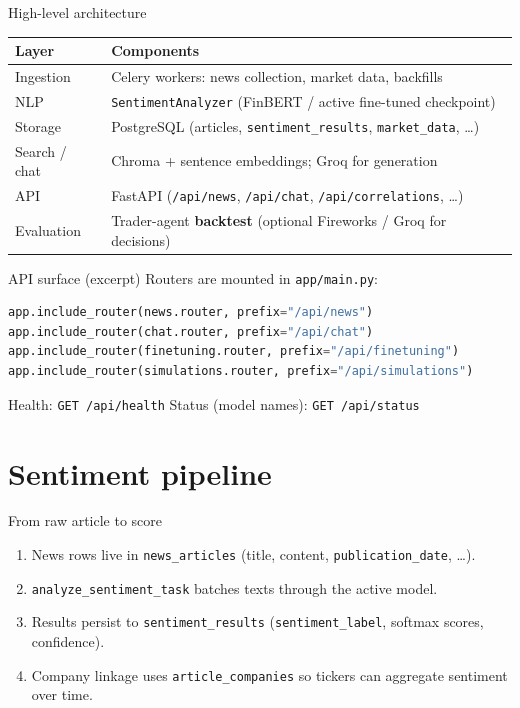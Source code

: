 \documentclass[aspectratio=169,11pt]{beamer}
\begin{document}
\begin{frame}{High-level architecture}
  \begin{center}
    \small
    \begin{tabular}{@{}l l@{}}
      \toprule
      \textbf{Layer} & \textbf{Components} \\
      \midrule
      Ingestion & Celery workers: news collection, market data, backfills \\
      NLP & \texttt{SentimentAnalyzer} (FinBERT / active fine-tuned checkpoint) \\
      Storage & PostgreSQL (articles, \texttt{sentiment\_results}, \texttt{market\_data}, \ldots) \\
      Search / chat & Chroma + sentence embeddings; Groq for generation \\
      API & FastAPI (\texttt{/api/news}, \texttt{/api/chat}, \texttt{/api/correlations}, \ldots) \\
      Evaluation & Trader-agent \textbf{backtest} (optional Fireworks / Groq for decisions) \\
      \bottomrule
    \end{tabular}
  \end{center}
\end{frame}

\begin{frame}[fragile]{API surface (excerpt)}
  Routers are mounted in \texttt{app/main.py}:
\begin{lstlisting}[language=Python]
app.include_router(news.router, prefix="/api/news")
app.include_router(chat.router, prefix="/api/chat")
app.include_router(finetuning.router, prefix="/api/finetuning")
app.include_router(simulations.router, prefix="/api/simulations")
\end{lstlisting}
  \vfill
  \footnotesize Health: \texttt{GET /api/health} \quad Status (model names): \texttt{GET /api/status}
\end{frame}

\section{Sentiment pipeline}

\begin{frame}{From raw article to score}
  \begin{enumerate}
    \item News rows live in \texttt{news\_articles} (title, content, \texttt{publication\_date}, \ldots).
    \item \texttt{analyze\_sentiment\_task} batches texts through the active model.
    \item Results persist to \texttt{sentiment\_results} (\texttt{sentiment\_label}, softmax scores, confidence).
    \item Company linkage uses \texttt{article\_companies} so tickers can aggregate sentiment over time.
  \end{enumerate}
\end{frame}
\end{document}
